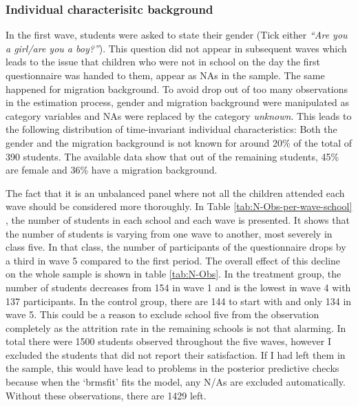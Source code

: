 \documentclass[a4, 12pt]{article}
\begin{document}
\hypertarget{individual-characterisitc-background}{%
\subsubsection{Individual characterisitc background}\label{individual-characterisitc-background}}

In the first wave, students were asked to state their gender (Tick either \emph{``Are you a girl/are you a boy?''}). This question did not appear in subsequent waves which leads to the issue that children who were not in school on the day the first questionnaire was handed to them, appear as NAs in the sample. The same happened for migration background. To avoid drop out of too many observations in the estimation process, gender and migration background were manipulated as category variables and NAs were replaced by the category \emph{unknown}. This leads to the following distribution of time-invariant individual characteristics: Both the gender and the migration background is not known for around 20\% of the total of 390 students. The available data show that out of the remaining students, 45\% are female and 36\% have a migration background.

The fact that it is an unbalanced panel where not all the children attended each wave should be considered more thoroughly. In Table \ref{tab:N-Obs-per-wave-school} , the number of students in each school and each wave is presented. It shows that the number of students is varying from one wave to another, most severely in class five. In that class, the number of participants of the questionnaire drops by a third in wave 5 compared to the first period. The overall effect of this decline on the whole sample is shown in table \ref{tab:N-Obs}. In the treatment group, the number of students decreases from 154 in wave 1 and is the lowest in wave 4 with 137 participants. In the control group, there are 144 to start with and only 134 in wave 5. This could be a reason to exclude school five from the observation completely as the attrition rate in the remaining schools is not that alarming. In total there were 1500 students observed throughout the five waves, however I excluded the students that did not report their satisfaction. If I had left them in the sample, this would have lead to problems in the posterior predictive checks because when the `brmsfit' fits the model, any N/As are excluded automatically. Without these observations, there are 1429 left.
\end{document}
